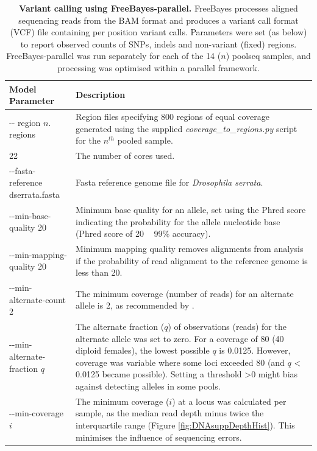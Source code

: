 \begin{table}[!htbp]
\renewcommand{\arraystretch}{1.4}
\begin{center}
\caption[Variant calling using FreeBayes-parallel.]{\textbf{Variant calling using FreeBayes-parallel.} FreeBayes processes aligned sequencing reads from the BAM format and produces a variant call format (VCF) file containing per position variant calls. Parameters were set (as below) to report observed counts of SNPs, indels and non-variant (fixed) regions. FreeBayes-parallel was run separately for each of the 14 ($n$) poolseq samples, and processing was optimised within a parallel framework.}
\label{tab:DNAsuppFreeBayParms}
\begin{tabular}{p{}p{}}
\toprule
\textbf{Model Parameter}	& \textbf{Description} \\
\midrule
 -{}- region $n$. regions	& Region files specifying 800 regions of equal coverage generated using the supplied \textit{coverage\_to\_regions.py} script for the $n^{th}$ pooled sample. \\
22	& The number of cores used.\\
-{}-fasta-reference dserrata.fasta &	Fasta reference genome file for \textit{Drosophila serrata}.\\
-{}-min-base-quality 20	& Minimum base quality for an allele, set using the Phred score indicating the probability for the allele nucleotide base (Phred score of 20 ~ 99\% accuracy).\\
-{}-min-mapping-quality 20	& Minimum mapping quality removes alignments from analysis if the probability of read alignment to the reference genome is less than 20. \\
-{}-min-alternate-count 2 & The minimum coverage (number of reads) for an alternate allele is 2, as recommended by \citet{Kofl11}.\\
-{}-min-alternate-fraction $q$	& The alternate fraction ($q$) of observations (reads) for the alternate allele was set to zero. For a coverage of 80 (40 diploid females), the lowest possible $q$ is 0.0125. However, coverage was variable where some loci exceeded 80 (and $q$ < 0.0125 became possible). Setting a threshold >0 might bias against detecting alleles in some pools.\\
-{}-min-coverage $i$	& The minimum coverage ($i$) at a locus was calculated per sample, as the median read depth minus twice the interquartile range (Figure \ref{fig:DNAsuppDepthHist}). This minimises the influence of sequencing errors. \\ 

\end{tabular}
\end{center}
\end{table}
